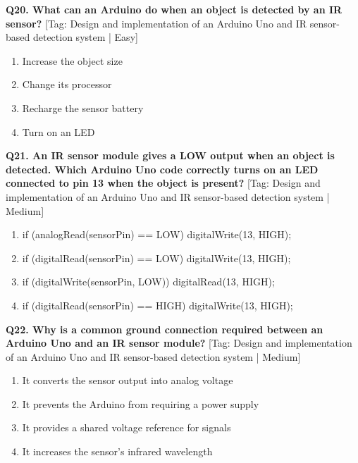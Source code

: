 \noindent\textbf{Q20. What can an Arduino do when an object is detected by an IR sensor?} \hfill [Tag: Design and implementation of an Arduino Uno and IR sensor-based detection system | Easy]
\begin{enumerate}[label=(\alph*),topsep=2pt,itemsep=1pt,partopsep=0pt,parsep=0pt]
    \item {Increase the object size}
    \item {Change its processor}
    \item {Recharge the sensor battery}
    \item {Turn on an LED}
\end{enumerate}
\vspace{2mm}

\noindent\textbf{Q21. An IR sensor module gives a LOW output when an object is detected. Which Arduino Uno code correctly turns on an LED connected to pin 13 when the object is present?} \hfill [Tag: Design and implementation of an Arduino Uno and IR sensor-based detection system | Medium]
\begin{enumerate}[label=(\alph*),topsep=2pt,itemsep=1pt,partopsep=0pt,parsep=0pt]
    \item {if (analogRead(sensorPin) == LOW) digitalWrite(13, HIGH);}
    \item {if (digitalRead(sensorPin) == LOW) digitalWrite(13, HIGH);}
    \item {if (digitalWrite(sensorPin, LOW)) digitalRead(13, HIGH);}
    \item {if (digitalRead(sensorPin) == HIGH) digitalWrite(13, HIGH);}
\end{enumerate}
\vspace{2mm}

\noindent\textbf{Q22. Why is a common ground connection required between an Arduino Uno and an IR sensor module?} \hfill [Tag: Design and implementation of an Arduino Uno and IR sensor-based detection system | Medium]
\begin{enumerate}[label=(\alph*),topsep=2pt,itemsep=1pt,partopsep=0pt,parsep=0pt]
    \item {It converts the sensor output into analog voltage}
    \item {It prevents the Arduino from requiring a power supply}
    \item {It provides a shared voltage reference for signals}
    \item {It increases the sensor's infrared wavelength}
\end{enumerate}
\vspace{2mm}

